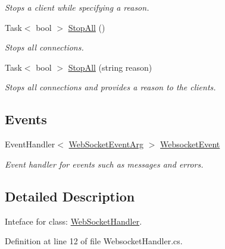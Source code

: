 \begin{DoxyCompactItemize}
\begin{DoxyCompactList}\small\item\em Stops a client while specifying a reason. \end{DoxyCompactList}\item 
Task$<$ bool $>$ \mbox{\hyperlink{interface_simple_web_socket_server_library_1_1_simple_web_socket_handler_1_1_i_web_socket_handler_a9320e5c10e5afa670c1377b5c0e2f762}{Stop\+All}} ()
\begin{DoxyCompactList}\small\item\em Stops all connections. \end{DoxyCompactList}\item 
Task$<$ bool $>$ \mbox{\hyperlink{interface_simple_web_socket_server_library_1_1_simple_web_socket_handler_1_1_i_web_socket_handler_a27d174acc63098601266f85f4e3f873f}{Stop\+All}} (string reason)
\begin{DoxyCompactList}\small\item\em Stops all connections and provides a reason to the clients. \end{DoxyCompactList}\end{DoxyCompactItemize}
\subsection*{Events}
\begin{DoxyCompactItemize}
\item 
Event\+Handler$<$ \mbox{\hyperlink{class_simple_web_socket_server_library_1_1_web_socket_event_arg}{Web\+Socket\+Event\+Arg}} $>$ \mbox{\hyperlink{interface_simple_web_socket_server_library_1_1_simple_web_socket_handler_1_1_i_web_socket_handler_a49e994104add420c0583de677b3cc4b1}{Websocket\+Event}}
\begin{DoxyCompactList}\small\item\em Event handler for events such as messages and errors. \end{DoxyCompactList}\end{DoxyCompactItemize}


\subsection{Detailed Description}
Inteface for class\+: \mbox{\hyperlink{class_simple_web_socket_server_library_1_1_simple_web_socket_handler_1_1_web_socket_handler}{Web\+Socket\+Handler}}. 



Definition at line 12 of file Websocket\+Handler.\+cs.



